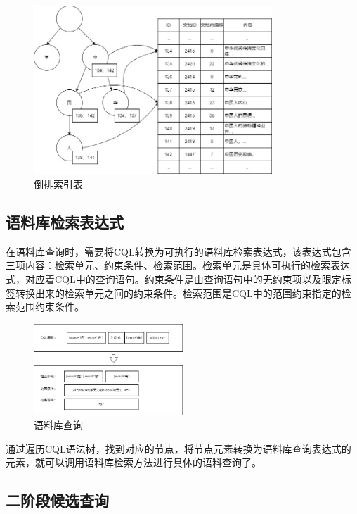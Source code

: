 \documentclass[11pt]{article}
\begin{document}
\begin{CJK*}{UTF8}{gbsn}
\begin{figure}[!h]
	\centering
	\includegraphics[width=0.8\textwidth]{image/daopaibiao.jpg}
	\caption{倒排索引表}
	\label{fig:daopaibiao}
\end{figure}

\subsection{语料库检索表达式}

在语料库查询时，需要将CQL转换为可执行的语料库检索表达式，该表达式包含三项内容：检索单元、约束条件、检索范围。检索单元是具体可执行的检索表达式，对应着CQL中的查询语句。约束条件是由查询语句中的无约束项以及限定标签转换出来的检索单元之间的约束条件。检索范围是CQL中的范围约束指定的检索范围约束条件。

\begin{figure}[h]
	\centering
	\includegraphics[width=0.5\textwidth]{image/jiansuoshi.jpg}
	\caption{语料库查询}
	\label{fig:jisnsuoshi}
\end{figure}

通过遍历CQL语法树，找到对应的节点，将节点元素转换为语料库查询表达式的元素，就可以调用语料库检索方法进行具体的语料查询了。

\subsection{二阶段候选查询}


\end{CJK*}
\end{document}
